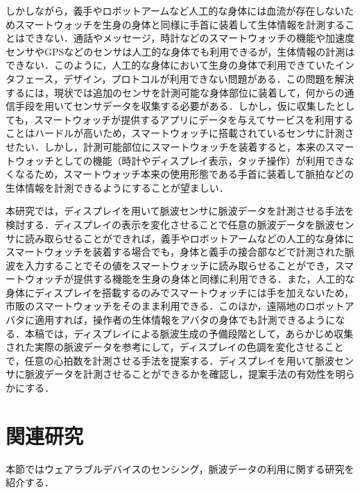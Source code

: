 \documentclass[submit,techrep]{ipsj}
\begin{document}
しかしながら，義手やロボットアームなど人工的な身体には血流が存在しないためスマートウォッチを生身の身体と同様に手首に装着して生体情報を計測することはできない．通話やメッセージ，時計などのスマートウォッチの機能や加速度センサやGPSなどのセンサは人工的な身体でも利用できるが，生体情報の計測はできない．このように，人工的な身体において生身の身体で利用できていたインタフェース，デザイン，プロトコルが利用できない問題がある．この問題を解決するには，現状では追加のセンサを計測可能な身体部位に装着して，何からの通信手段を用いてセンサデータを収集する必要がある．しかし，仮に収集したとしても，スマートウォッチが提供するアプリにデータを与えてサービスを利用することはハードルが高いため，スマートウォッチに搭載されているセンサに計測させたい．しかし，計測可能部位にスマートウォッチを装着すると，本来のスマートウォッチとしての機能（時計やディスプレイ表示，タッチ操作）が利用できなくなるため，スマートウォッチ本来の使用形態である手首に装着して脈拍などの生体情報を計測できるようにすることが望ましい．
\par

本研究では，ディスプレイを用いて脈波センサに脈波データを計測させる手法を検討する．ディスプレイの表示を変化させることで任意の脈波データを脈波センサに読み取らせることができれば，義手やロボットアームなどの人工的な身体にスマートウォッチを装着する場合でも，身体と義手の接合部などで計測された脈波を入力することでその値をスマートウォッチに読み取らせることができ，スマートウォッチが提供する機能を生身の身体と同様に利用できる．また，人工的な身体にディスプレイを搭載するのみでスマートウォッチには手を加えないため，市販のスマートウォッチをそのまま利用できる．このほか，遠隔地のロボットアバタに適用すれば，操作者の生体情報をアバタの身体でも計測できるようになる．本稿では，ディスプレイによる脈波生成の予備段階として，あらかじめ収集された実際の脈波データを参考にして，ディスプレイの色調を変化させることで，任意の心拍数を計測させる手法を提案する．ディスプレイを用いて脈波センサに脈波データを計測させることができるかを確認し，提案手法の有効性を明らかにする．
\par



\section{関連研究}
\label{related}
本節ではウェアラブルデバイスのセンシング，脈波データの利用に関する研究を紹介する．
\end{document}
